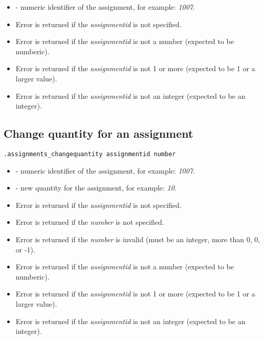 \paramsheader
\begin{itemize}
    \item {} - numeric identifier of the assignment, for example: \textit{1007}.
\end{itemize}

\errheader
\begin{itemize}
    \item Error  is returned if the \textit{assignmentid} is not specified.
    \item Error  is returned if the \textit{assignmentid} is not a number (expected to be numberic).
    \item Error  is returned if the \textit{assignmentid} is not 1 or more (expected to be 1 or a larger value).
    \item Error  is returned if the \textit{assignmentid} is not an integer (expected to be an integer).
\end{itemize}



\subsection{Change quantity for an assignment}

\begin{lstlisting}[style=CommandLineStyle]
.assignments_changequantity assignmentid number
\end{lstlisting}

\paramsheader
\begin{itemize}
    \item {} - numeric identifier of the assignment, for example: \textit{1007}.
    \item {} - new quantity for the assignment, for example: \textit{10}.
\end{itemize}

\errheader
\begin{itemize}
    \item Error  is returned if the \textit{assignmentid} is not specified.
    \item Error  is returned if the \textit{number} is not specified.
    \item Error  is returned if the \textit{number} is invalid (must be an integer, more than 0, 0, or -1).
    \item Error  is returned if the \textit{assignmentid} is not a number (expected to be numberic).
    \item Error  is returned if the \textit{assignmentid} is not 1 or more (expected to be 1 or a larger value).
    \item Error  is returned if the \textit{assignmentid} is not an integer (expected to be an integer).
\end{itemize}


